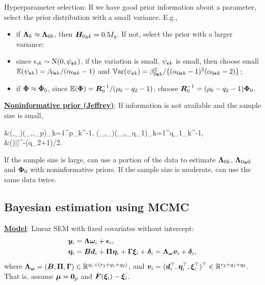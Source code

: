 \documentclass[10pt,a4paper]{book}
\begin{document}
{{Hyperparameter selection}}: If we have good prior information about a parameter, select the prior
distribution with a small variance. E.g., 
\begin{itemize}
	\item if ${\boldsymbol\Lambda}_k\approx{\boldsymbol\Lambda}_{0k}$, then ${\boldsymbol H}_{0yk}=0.5 I_q$. If not, select the prior with a larger variance;
	\item since $\epsilon_{ik}\sim \mathrm{N}(0,\psi_{{\boldsymbol\epsilon} k})$, if the variation is small, $\psi_{{\boldsymbol\epsilon} k}$ is small, then choose small $\mathbb E(\psi_{{\boldsymbol\epsilon} k})=\beta_{0{\boldsymbol\epsilon} k}/(\alpha_{0{\boldsymbol\epsilon} k}-1)$ and $\mathbb{V}\mathrm{ar}(\psi_{{\boldsymbol\epsilon} k})=\beta_{0{\boldsymbol\epsilon} k}^2/\{(\alpha_{0{\boldsymbol\epsilon} k}-1)^2(\alpha_{0{\boldsymbol\epsilon} k}-2)\}$;
	\item if ${\boldsymbol\Phi}\approx {\boldsymbol\Phi}_{0}$, since $\mathbb E({\boldsymbol\Phi})={\boldsymbol R}_0^{-1}/(\rho_0-q_2-1)$, choose ${\boldsymbol R}_0^{-1}=(\rho_0-q_2-1){\boldsymbol\Phi}_0$.   
\end{itemize}

\noindent\textbf{\underline{Noninformative prior (Jeffrey)}}: If information is not available and the sample size is small, 
\begin{sequation*}
	\begin{aligned}
		&\bbP(\baL,\baY_{\bae})\propto \bbP(\psi_{},\cdots,\psi_{\bae p})\propto\prod_{k=1}^{p}\psi_{\bae k}^{-1},\quad 
		\bbP(\baL_{\bao},\baY_{\bad})\propto \bbP(\psi_{},\cdots,\psi_{\bad q_{1}})\propto\prod_{k=1}^{q_{1}}\psi_{\bad k}^{-1},\\
		&\bbP(\baF)\propto|\baF|^{-(q_2+1)/2}.\end{aligned}
\end{sequation*}
If the sample size is large, can use a portion of the data to estimate ${\boldsymbol\Lambda}_{0k}$, ${\boldsymbol\Lambda}_{0{\boldsymbol\omega} k}$ and ${\boldsymbol\Phi}_0$ with noninformative priors. If the sample size is moderate, can use the same data twice.  


\subsection{Bayesian estimation using MCMC}
\textbf{\underline{Model}}: Linear SEM with fixed covariates without intercept:
\begin{equation*}
	\begin{aligned}
		{\boldsymbol y}_i&={\boldsymbol\Lambda}{\boldsymbol\omega}_i+{\boldsymbol\epsilon}_i, \\
		{\boldsymbol\eta}_i&={\boldsymbol B}{\boldsymbol d}_i+{\boldsymbol\Pi}{\boldsymbol\eta}_i+{\boldsymbol\Gamma}{\boldsymbol\xi}_i+{\boldsymbol\delta}_i={\boldsymbol\Lambda}_{{\boldsymbol\omega}}{\boldsymbol v}_i+{\boldsymbol\delta}_i,
	\end{aligned}
\end{equation*}
where ${\boldsymbol\Lambda}_{{\boldsymbol\omega}}=({\boldsymbol B},{\boldsymbol\Pi},{\boldsymbol\Gamma})\in\mathbb R^{q_1\times (r_2+q_1+q_2)}$, and ${\boldsymbol v}_i=({\boldsymbol d}_i^\top,{\boldsymbol\eta}_i^\top,{\boldsymbol\xi}_i^\top)^\top\in\mathbb R^{r_2+q_1+q_2}$. 
That is, assume ${\boldsymbol\mu}={\boldsymbol 0}_p$ and ${\boldsymbol F}({\boldsymbol\xi}_i)-{\boldsymbol\xi}_i$. 
\end{document}
